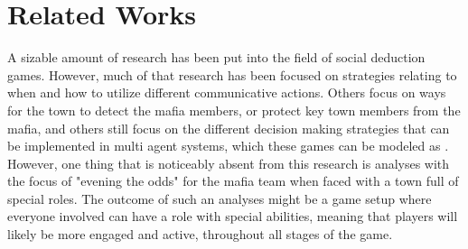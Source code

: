 \section{Related Works}
A sizable amount of research has been put into the field of social deduction 
games. However, much of that research has been focused on strategies relating 
to when and how to utilize different communicative actions\cite{commitment}. 
Others focus on ways for the town to detect the mafia 
members\cite{werewolf_stealth}, or protect key town members from the 
mafia\cite{werewolf_nash_equilibrium}, and others still focus on the different 
decision making strategies that can be implemented in multi agent systems, 
which these games can be modeled 
as\cite{modelling_multi_agent_epistemic_systems} 
\cite{multi_agent_epistemic_planner_common_knowledge} 
\cite{probibalistic_multiagent_systems}.
However, one thing that is noticeably absent from this research is analyses 
with the focus of "evening the odds" for the mafia team when faced with a town 
full of special roles. The outcome of such an analyses might be a game setup 
where everyone involved can have a role with special abilities, meaning that 
players will likely be more engaged and active, throughout all stages of the 
game. 

